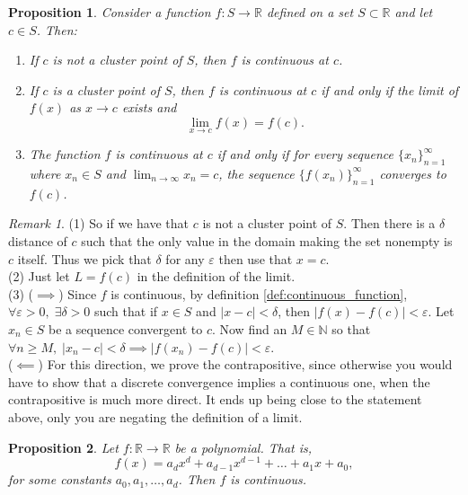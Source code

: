 \documentclass{article}
\newtheorem{proposition}{Proposition}[section]
\theoremstyle{definition}
\theoremstyle{remark}
\newtheorem{remark}{Remark}[section]
\begin{document}
\vspace{.5cm}
\begin{proposition}
Consider a function $f : S \to \mathbb{R}$ defined on a set $S \subset \mathbb{R}$ and let $c \in S$. Then:
\begin{enumerate}
\item If $c$ is not a cluster point of $S$, then $f$ is continuous at $c$.
\item If $c$ is a cluster point of $S$, then $f$ is continuous at $c$ if and only if the limit of $f(x)$ as $x \to c$ exists and
\[
\lim_{x\to c} f(x) = f(c).
\]
\item The function $f$ is continuous at $c$ if and only if for every sequence $\{x_n\}_{n=1}^{\infty}$ where $x_n \in S$ and $\lim_{n\to\infty} x_n = c$, the sequence $\{f(x_n)\}_{n=1}^{\infty}$ converges to $f(c)$.
\end{enumerate}
\end{proposition}

\begin{remark}
(1) \; So if we have that $c$ is not a cluster point of $S$. 
Then there is a $\delta$ distance of $c$ such that 
the only value in the domain making the set nonempty is $c$ itself. 
Thus we pick that $\delta$ for any $\varepsilon$ then use that $x = c$.\\
(2) \indent Just let $L=f(c)$ in the definition of the limit. \\
(3) \indent ($\implies$) Since $f$ is continuous, by definition \ref{def:continuous_function}, 
$\forall \varepsilon > 0, \; \exists \delta > 0$ such that if $x \in S$ and $|x - c| < \delta$, 
then $|f(x)-f(c)| < \varepsilon$. Let $x_n \in S$ be a sequence convergent to $c$. Now find an $M \in \mathbb{N}$ so that $\forall n \geq M, \; |x_n-c| < \delta \implies |f(x_n) - f(c)|<\varepsilon$.\\
\indent ($\impliedby$) For this direction, we prove the contrapositive, since otherwise you 
would have to show that a discrete convergence implies a continuous one, when the contrapositive is much more direct. 
It ends up being close to the statement above, only you are negating the definition of a limit.
\end{remark}




\vspace{.5cm}
\begin{proposition}
Let $f : \mathbb{R} \to \mathbb{R}$ be a polynomial. That is,
\[
f(x) = a_d x^d + a_{d-1} x^{d-1} + \dots + a_1 x + a_0,
\]
for some constants $a_0, a_1, \dots, a_d$. Then $f$ is continuous.
\end{proposition}
\end{document}
